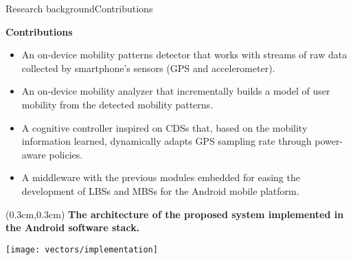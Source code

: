 \begin{frame}[noframenumbering]{Research background}{Contributions}
\small
\begin{block}{\small \textbf{Contributions}}
\begin{itemize}
  \item An on-device mobility patterns detector that works with streams of raw data collected by smartphone's sensors (GPS and accelerometer).
  \item An on-device mobility analyzer that incrementally builds a model of user mobility from the detected mobility patterns.
  \item A cognitive controller inspired on CDSs that, based on the mobility information learned, dynamically adapts GPS sampling rate through power-aware policies. 
  \item A middleware with the previous modules embedded for easing the development of LBSs and MBSs for the Android mobile platform.
\end{itemize}
\end{block}
\end{frame}

{\aauwavesbg%
  \begin{textblock*}{5cm}(0.3cm,0.3cm)
  \small
  \textbf{The architecture of the proposed system implemented in the Android software stack.}
  \end{textblock*}
\begin{frame}
  \centering
  \texttt{[image: vectors/implementation]}
\end{frame}}

